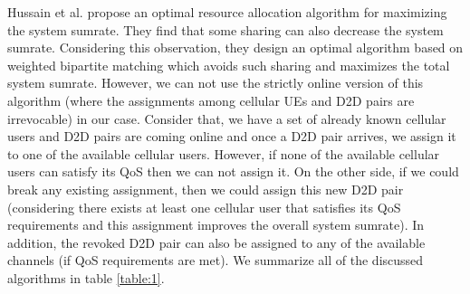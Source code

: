\documentclass[times]{dacauth}
\begin{document}
\smallskip
\noindent
Hussain et al. \cite{ccnc} propose an optimal resource allocation algorithm for maximizing the system sumrate. They find that some sharing can also decrease the system sumrate. Considering this observation, they design an optimal algorithm based on weighted bipartite matching which avoids such sharing and maximizes the total system sumrate. However, we can not use the strictly online version of this algorithm (where the assignments among cellular UEs and D2D pairs are irrevocable) in our case. Consider that, we have a set of already known cellular users and D2D pairs are coming online and once a D2D pair arrives, we assign it to one of the available cellular users. However, if none of the available cellular users can satisfy its QoS then we can not assign it. On the other side, if we could break any existing assignment, then we could assign this new D2D pair (considering there exists at least one cellular user that satisfies its QoS requirements and this assignment improves the overall system sumrate). In addition, the revoked D2D pair can also be assigned to any of the available channels (if QoS requirements are met). We summarize all of the discussed algorithms in table \ref{table:1}.
\end{document}
